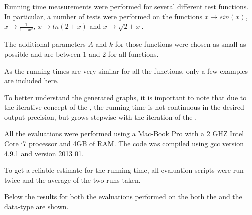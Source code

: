     Running time measurements were performed for several different test functions.
 		In particular, a number of tests were performed on the functions $x \to sin(x)$, $x \to \frac{1}{1+x^2}$, $x \to ln(2+x)$ and $x \to \sqrt{2+x}$. 
    
    The additional parameters $A$ and $k$ for those functions were chosen as small as possible and are between $1$ and $2$ for all functions.

    As the running times are very similar for all the functions, only a few examples are included here.

 		To better understand the generated graphs, it is important to note that due to the iterative concept of the \irram,
    the running time is not continuous in the desired output precision, but grows stepwise with the iteration of the \irram.

    All the evaluations were performed using a Mac-Book Pro with a 2 GHZ Intel Core i7 processor and 4GB of RAM.
    The code was compiled using gcc version 4.9.1 and \irram version 2013 01.

    To get a reliable estimate for the running time, all evaluation scripts were run twice and 
    the average of the two runs taken.

    Below the results for both the evaluations performed on the both the \baana and the \anarect data-type are shown. 
		\subsection{\baana}

